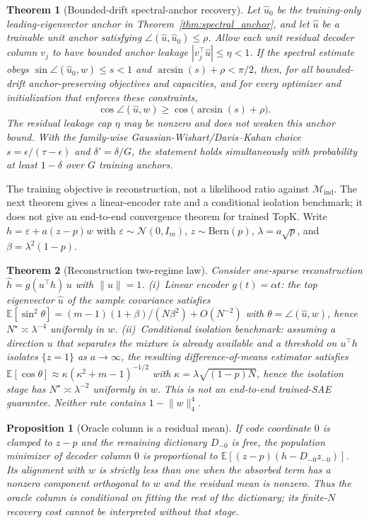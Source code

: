 \documentclass{article}
\theoremstyle{plain}
\newtheorem{theorem}{Theorem}
\newtheorem{proposition}{Proposition}
\newcommand{\Mind}{\mathcal{M}_{\mathrm{ind}}}
\begin{document}
\begin{theorem}[Bounded-drift spectral-anchor recovery]
\label{thm:bounded_drift_anchor}
Let $\widehat u_0$ be the training-only leading-eigenvector anchor in Theorem~\ref{thm:spectral_anchor}, and let $\widehat u$ be a trainable unit anchor satisfying $\angle(\widehat u,\widehat u_0)\le\rho$. Allow each unit residual decoder column $v_j$ to have bounded anchor leakage $|v_j^\top\widehat u|\le\eta<1$. If the spectral estimate obeys $\sin\angle(\widehat u_0,w)\le s<1$ and $\arcsin(s)+\rho<\pi/2$, then, for all bounded-drift anchor-preserving objectives and capacities, and for every optimizer and initialization that enforces these constraints,\[\cos\angle(\widehat u,w)\ge\cos\bigl(\arcsin(s)+\rho\bigr).\] The residual leakage cap $\eta$ may be nonzero and does not weaken this anchor bound. With the family-wise Gaussian-Wishart/Davis--Kahan choice $s=\epsilon/(\tau-\epsilon)$ and $\delta'=\delta/G$, the statement holds simultaneously with probability at least $1-\delta$ over $G$ training anchors.
\end{theorem}

The training objective is reconstruction, not a likelihood ratio against $\Mind$. The next theorem gives a linear-encoder rate and a conditional isolation benchmark; it does not give an end-to-end convergence theorem for trained TopK. Write $h=\varepsilon+a(z-p)w$ with $\varepsilon\sim\mathcal{N}(0,I_m)$, $z\sim\mathrm{Bern}(p)$, $\lambda=a\sqrt{p}$, and $\beta=\lambda^2(1-p)$.

\begin{theorem}[Reconstruction two-regime law]
\label{thm:recon}
Consider one-sparse reconstruction $\hat h=g(u^{\top}h)\,u$ with $\lVert u\rVert=1$.
(i)~Linear encoder $g(t)=\alpha t$: the top eigenvector $\hat u$ of the sample covariance satisfies $\mathbb{E}[\sin^2\theta]=(m-1)(1+\beta)/(N\beta^2)+O(N^{-2})$ with $\theta=\angle(\hat u,w)$, hence $N^\star\asymp\lambda^{-4}$ uniformly in $w$.
(ii)~Conditional isolation benchmark: assuming a direction $u$ that separates the mixture is already available and a threshold on $u^{\top}h$ isolates $\{z=1\}$ as $a\to\infty$, the resulting difference-of-means estimator satisfies $\mathbb{E}[\cos\theta]\approx\kappa(\kappa^2+m-1)^{-1/2}$ with $\kappa=\lambda\sqrt{(1-p)N}$, hence the isolation stage has $N^\star\asymp\lambda^{-2}$ uniformly in $w$. This is not an end-to-end trained-SAE guarantee.
Neither rate contains $1-\lVert w\rVert_4^4$.
\end{theorem}

\begin{proposition}[Oracle column is a residual mean]
\label{prop:oracle}
If code coordinate $0$ is clamped to $z-p$ and the remaining dictionary $D_{-0}$ is free, the population minimizer of decoder column $0$ is proportional to $\mathbb{E}[(z-p)(h-D_{-0}z_{-0})]$. Its alignment with $w$ is strictly less than one when the absorbed term has a nonzero component orthogonal to $w$ and the residual mean is nonzero. Thus the oracle column is conditional on fitting the rest of the dictionary; its finite-$N$ recovery cost cannot be interpreted without that stage.
\end{proposition}
\end{document}
